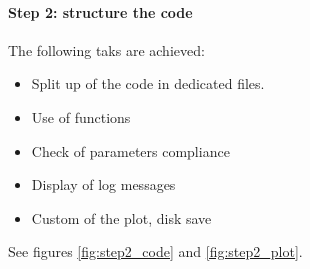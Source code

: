 \documentclass[11pt]{article}
\begin{document}
				\newpage
				\paragraph{Step 2: structure the code}
					The following taks are achieved:
					\begin{itemize}
							\setlength\itemsep{0pt}
							\item Split up of the code in dedicated files.
							\item Use of functions
							\item Check of parameters compliance
							\item Display of log messages
							\item Custom of the plot, disk save
					\end{itemize}
					See figures \ref{fig:step2_code} and \ref{fig:step2_plot}.
\end{document}
